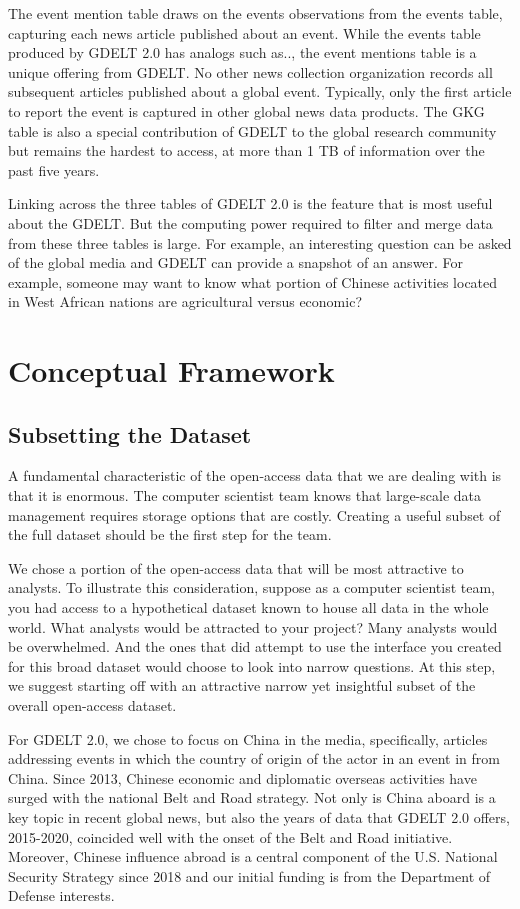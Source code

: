 \documentclass[preprint,authoryear,12pt]{elsarticle/elsarticle}
\begin{document}
The event mention table draws on the events observations from the events table, capturing each news article published about an event. While the events table produced by GDELT 2.0 has analogs such as.., the event mentions table is a unique offering from GDELT. No other news collection organization records all subsequent articles published about a global event. Typically, only the first article to report the event is captured in other global news data products. The GKG table is also a special contribution of GDELT to the global research community but remains the hardest to access, at more than 1 TB of information over the past five years.

Linking across the three tables of GDELT 2.0 is the feature that is most useful about the GDELT. But the computing power required to filter and merge data from these three tables is large. For example, an interesting question can be asked of the global media and GDELT can provide a snapshot of an answer. For example, someone may want to know what portion of Chinese activities located in West African nations are agricultural versus economic? 

\section{Conceptual Framework}
\label{sec:concept}

\subsection{Subsetting the Dataset}
\label{sec:subset}
A fundamental characteristic of the open-access data that we are dealing with is that it is enormous. The computer scientist team knows that large-scale data management requires storage options that are costly. Creating a useful subset of the full dataset should be the first step for the team. 

We chose a portion of the open-access data that will be most attractive to analysts. To illustrate this consideration, suppose as a computer scientist team, you had access to a hypothetical dataset known to house all data in the whole world. What analysts would be attracted to your project? Many analysts would be overwhelmed. And the ones that did attempt to use the interface you created for this broad dataset would choose to look into narrow questions. At this step, we suggest starting off with an attractive narrow yet insightful subset of the overall open-access dataset.

For GDELT 2.0, we chose to focus on China in the media, specifically, articles addressing events in which the country of origin of the actor in an event in from China. Since 2013, Chinese economic and diplomatic overseas activities have surged with the national Belt and Road strategy. Not only is China aboard is a key topic in recent global news, but also the years of data that GDELT 2.0 offers, 2015-2020, coincided well with the onset of the Belt and Road initiative. Moreover, Chinese influence abroad is a central component of the U.S. National Security Strategy since 2018 and our initial funding is from the Department of Defense interests.
\end{document}
